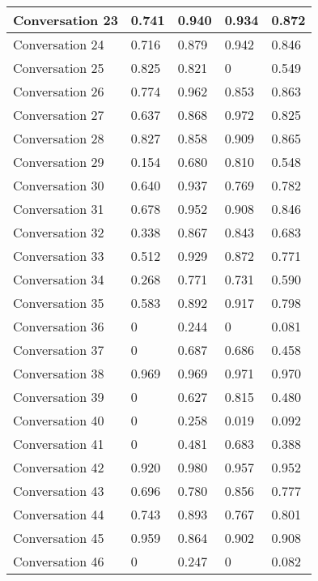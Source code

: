 \begin{table}[]
\begin{tabular}{|l|l|l|l|l|}
Conversation 23  & 0.741    & 0.940 & 0.934       & 0.872   \\ \hline
Conversation 24  & 0.716    & 0.879 & 0.942       & 0.846   \\ \hline
Conversation 25  & 0.825    & 0.821 & 0           & 0.549   \\ \hline
Conversation 26  & 0.774    & 0.962 & 0.853       & 0.863   \\ \hline
Conversation 27  & 0.637    & 0.868 & 0.972       & 0.825   \\ \hline
Conversation 28  & 0.827    & 0.858 & 0.909       & 0.865   \\ \hline
Conversation 29  & 0.154    & 0.680 & 0.810       & 0.548   \\ \hline
Conversation 30  & 0.640    & 0.937 & 0.769       & 0.782   \\ \hline
Conversation 31  & 0.678    & 0.952 & 0.908       & 0.846   \\ \hline
Conversation 32  & 0.338    & 0.867 & 0.843       & 0.683   \\ \hline
Conversation 33  & 0.512    & 0.929 & 0.872       & 0.771   \\ \hline
Conversation 34  & 0.268    & 0.771 & 0.731       & 0.590   \\ \hline
Conversation 35  & 0.583    & 0.892 & 0.917       & 0.798   \\ \hline
Conversation 36  & 0        & 0.244 & 0           & 0.081   \\ \hline
Conversation 37  & 0        & 0.687 & 0.686       & 0.458   \\ \hline
Conversation 38  & 0.969    & 0.969 & 0.971       & 0.970   \\ \hline
Conversation 39  & 0        & 0.627 & 0.815       & 0.480   \\ \hline
Conversation 40  & 0        & 0.258 & 0.019       & 0.092   \\ \hline
Conversation 41  & 0        & 0.481 & 0.683       & 0.388   \\ \hline
Conversation 42  & 0.920    & 0.980 & 0.957       & 0.952   \\ \hline
Conversation 43  & 0.696    & 0.780 & 0.856       & 0.777   \\ \hline
Conversation 44  & 0.743    & 0.893 & 0.767       & 0.801   \\ \hline
Conversation 45  & 0.959    & 0.864 & 0.902       & 0.908   \\ \hline
Conversation 46  & 0        & 0.247 & 0           & 0.082   \\ \hline

\end{tabular}
\end{table}
